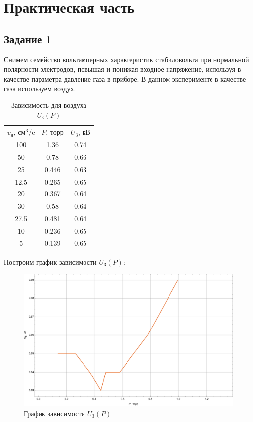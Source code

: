 \documentclass[a4paper, 12pt]{article}
\begin{document}
\section{Практическая часть}
\subsection{Задание 1}
Снимем семейство вольтамперных характеристик стабиловольта при нормальной полярности электродов, повышая и понижая входное напряжение, используя в качестве параметра давление газа в приборе. В данном эксперименте в качестве газа используем воздух.
\par
\begin{table}[h!]
\centering
\begin{tabular}{|c|c|c|}
\hline
$v_\text{н}\text{, см}^3\text{/c}$ & $P\text{, торр}$ & $U_3\text{, кВ}$ \\
\hline
100 & 1.36 & 0.74 \\
\hline
50 & 0.78 & 0.66 \\
\hline
25 & 0.446 & 0.63 \\
\hline
12.5 & 0.265 & 0.65 \\
\hline
20 & 0.367 & 0.64 \\
\hline
30 & 0.58 & 0.64 \\
\hline
27.5 & 0.481 & 0.64 \\
\hline
10 & 0.236 & 0.65 \\
\hline
5 & 0.139 & 0.65 \\
\hline
\end{tabular}
\caption{Зависимость для воздуха $U_3\left(P\right)$}
\end{table}
Построим график зависимости $U_3\left(P\right)$:
\begin{figure}[h!]
\centering
\includegraphics[scale=0.42]{MyGraph1.pdf}
\caption{График зависимости $U_3\left(P\right)$}
\label{fig:exp1}
\end{figure}
\end{document}
